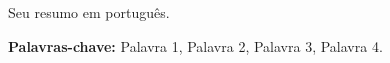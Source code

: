 \begin{resumo}
Seu resumo em português.

\noindent \textbf{Palavras-chave:} Palavra 1, Palavra 2, Palavra 3, Palavra 4.
\end{resumo}
